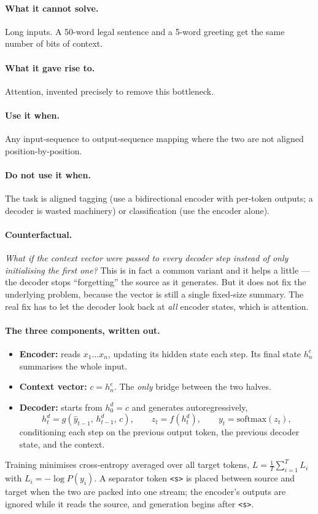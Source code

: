 \documentclass[11pt,a4paper]{article}
\begin{document}
\paragraph{What it cannot solve.} Long inputs. A 50-word legal sentence and a 5-word
greeting get the same number of bits of context.

\paragraph{What it gave rise to.} Attention, invented precisely to remove this bottleneck.

\paragraph{Use it when.} Any input-sequence to output-sequence mapping where the two are not
aligned position-by-position.

\paragraph{Do not use it when.} The task is aligned tagging (use a bidirectional encoder
with per-token outputs; a decoder is wasted machinery) or classification (use the encoder
alone).

\paragraph{Counterfactual.} \emph{What if the context vector were passed to every decoder
step instead of only initialising the first one?} This is in fact a common variant and it
helps a little --- the decoder stops ``forgetting'' the source as it generates. But it does
not fix the underlying problem, because the vector is still a single fixed-size summary.
The real fix has to let the decoder look back at \emph{all} encoder states, which is
attention.

\paragraph{The three components, written out.}
\begin{itemize}
\item \textbf{Encoder:} reads $x_1 \ldots x_n$, updating its hidden state each step. Its
  final state $h_n^e$ summarises the whole input.
\item \textbf{Context vector:} $c = h_n^e$. The \emph{only} bridge between the two halves.
\item \textbf{Decoder:} starts from $h_0^d = c$ and generates autoregressively,
  \[
  h_t^d = g(\hat{y}_{t-1},\, h_{t-1}^d,\, c), \qquad
  z_t = f(h_t^d), \qquad y_t = \mathrm{softmax}(z_t),
  \]
  conditioning each step on the previous output token, the previous decoder state, and the
  context.
\end{itemize}
Training minimises cross-entropy averaged over all target tokens,
$L = \frac{1}{T}\sum_{i=1}^{T} L_i$ with $L_i = -\log P(y_i)$. A separator token
\texttt{<s>} is placed between source and target when the two are packed into one stream; the
encoder's outputs are ignored while it reads the source, and generation begins after
\texttt{<s>}.
\end{document}
